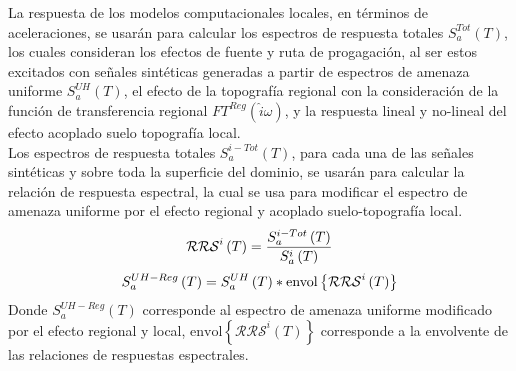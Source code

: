 \documentclass[spanish,letterpaper,12pt,twoside,openany]{article}
\begin{document}
La respuesta de los modelos computacionales locales, en términos de aceleraciones, se usarán para calcular los espectros de respuesta totales $S_{a}^{Tot} \left( T \right)$, los cuales consideran los efectos de fuente y ruta de progagación, al ser estos excitados con señales sintéticas generadas a partir de espectros de amenaza uniforme $S_{a}^{UH} \left( T \right)$, el efecto de la topografía regional con la consideración de la función de transferencia regional $FT^{Reg} \left( \hat{i} \omega \right)$, y la respuesta lineal y no-lineal del efecto acoplado suelo topografía local.\\
%
Los espectros de respuesta totales $S_{a}^{i-Tot} \left( T \right)$, para cada una de las señales sintéticas y sobre toda la superficie del dominio, se usarán para calcular la relación de respuesta espectral, la cual se usa para modificar el espectro de amenaza uniforme por el efecto regional y acoplado suelo-topografía local.
%
	\begin{align}\label{eq:rrs}
		\mathcal{RRS}^{i} \left( T \right) = \dfrac{S_{a}^{i-Tot} \left( T \right)}{S_{a}^{i} \left( T \right)}
	\vspace{-1 cm}
	\end{align}
%
	\begin{align}\label{eq:rrs}
		S_{a}^{UH-Reg} \left( T \right) = S_{a}^{UH} \left( T \right) * \text{envol} \left\lbrace \mathcal{RRS}^{i} \left( T \right) \right\rbrace
	\vspace{-1 cm}
	\end{align}
%
Donde $S_{a}^{UH-Reg} \left( T \right)$ corresponde al espectro de amenaza uniforme modificado por el efecto regional y local, $\text{envol} \left\lbrace \mathcal{RRS}^{i} \left( T \right) \right\rbrace$ corresponde a la envolvente de las relaciones de respuestas espectrales.
%
%
%
%
%
\newpage
%
\end{document}

